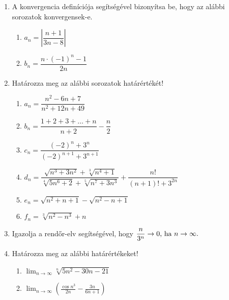 \documentclass[a4paper, 12pt]{scrartcl}
\begin{document}
\begin{enumerate}
  \item A konvergencia definíciója segítségével bizonyítsa be, hogy az alábbi
        sorozatok kon\-ver\-gens\-ek-e.
        \begin{enumerate}
          \item $a_n = \left|
                  \dfrac{n + 1}{3n - 8}
                  \right|$

          \item $b_n = \dfrac{n \cdot (-1)^n - 1}{2n}$
        \end{enumerate}

  \item Határozza meg az alábbi sorozatok határértékét!
        \begin{enumerate}
          \item $a_n = \dfrac{n^2 - 6n + 7}{n^2 + 12n + 49}$

          \item $b_n = \dfrac{1 + 2 + 3 + \dots + n}{n + 2} - \dfrac{n}{2}$

          \item $c_n = \dfrac{(-2)^n + 3^n}{(-2)^{n + 1} + 3^{n + 1}}$

          \item $d_n = \dfrac{
                    \sqrt{n^3 + 3n^2} + \sqrt[3]{n^4 + 1}
                  }{
                    \sqrt[4]{5n^6 + 2} + \sqrt[5]{n^7 + 3n^3}
                  } + \dfrac{n!}{(n+1)! + 3^{2n}}$

          \item $e_n = \sqrt{n^2 + n + 1} - \sqrt{n^2 - n + 1}$

          \item $f_n = \sqrt[3]{n^2 - n^3} + n$
        \end{enumerate}

  \item Igazolja a rendőr-elv segítségével, hogy
        $
          \dfrac{n}{3^n} \rightarrow 0
          \text{, ha }
          n \rightarrow \infty
          \text.
        $

  \item Határozza meg az alábbi határértékeket!
        \begin{enumerate}
          \item $\displaystyle
                  \lim_{n \rightarrow \infty} \sqrt[n]{5n^2 - 30n - 21}
                $

          \item $\displaystyle
                  \lim_{n \rightarrow \infty} \left(
                  \frac{\cos n^3}{2n} - \frac{3n}{6n+1}
                  \right)
                $


\end{enumerate}
\end{enumerate}
\end{document}
